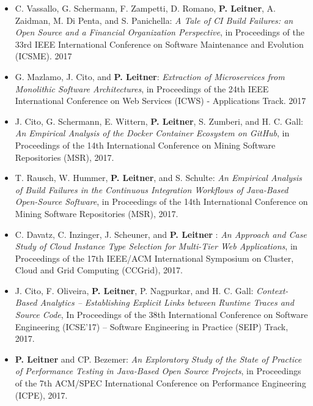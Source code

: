 \documentclass[paper=letter,fontsize=11pt]{scrartcl} %
\begin{document}
\begin{itemize}
	\item C. Vassallo, G. Schermann, F. Zampetti, D. Romano, \textbf{P. Leitner}, A. Zaidman, M. Di Penta, and S. Panichella: \emph{A Tale of CI Build Failures: an Open Source and a Financial Organization Perspective}, in Proceedings of the 33rd IEEE International Conference on Software Maintenance and Evolution (ICSME). 2017
	\item G. Mazlamo, J. Cito, and \textbf{P. Leitner}: \emph{Extraction of Microservices from Monolithic Software Architectures}, in Proceedings of the 24th IEEE International Conference on Web Services (ICWS) - Applications Track. 2017
	\item J. Cito, G. Schermann, E. Wittern, \textbf{P. Leitner}, S. Zumberi, and H. C. Gall: \emph{An Empirical Analysis of the Docker Container Ecosystem on GitHub}, in Proceedings of the 14th International Conference on Mining Software Repositories (MSR), 2017.
	\item T. Rausch, W. Hummer, \textbf{P. Leitner}, and S. Schulte: \emph{An Empirical Analysis of Build Failures in the Continuous Integration Workflows of Java-Based Open-Source Software}, in Proceedings of the 14th International Conference on Mining Software Repositories (MSR), 2017.
	\item C. Davatz, C. Inzinger, J. Scheuner, and \textbf{P. Leitner} : \emph{An Approach and Case Study of Cloud Instance Type Selection for Multi-Tier Web Applications}, in Proceedings of the 17th IEEE/ACM International Symposium on Cluster, Cloud and Grid Computing (CCGrid), 2017.
	\item J. Cito, F. Oliveira, \textbf{P. Leitner}, P. Nagpurkar, and H. C. Gall: \emph{Context-Based Analytics – Establishing Explicit Links between Runtime Traces and Source Code}, In Proceedings of the 38th International Conference on Software Engineering (ICSE'17) -- Software Engineering in Practice (SEIP) Track, 2017.
        \item \textbf{P. Leitner} and CP. Bezemer: \emph{An Exploratory Study of the State of Practice of Performance Testing in Java-Based Open Source Projects}, in  Proceedings of the 7th ACM/SPEC International Conference on Performance Engineering (ICPE), 2017.
\end{itemize}
\end{document}
